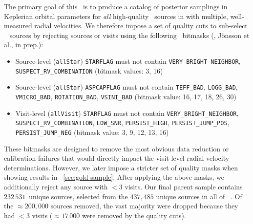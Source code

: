 \documentclass[modern]{aastex63}
\newcommand{\nsources}{\ensuremath{232\,531}}
\begin{document}
The primary goal of this \documentname\ is to produce a catalog of posterior
samplings in Keplerian orbital parameters for \emph{all} high-quality \apogee\
sources in  with multiple, well-measured radial velocities.
We therefore impose a set of quality cuts to sub-select \apogee\  sources
by rejecting sources or visits using the following \apogee\
bitmasks (\citealt{Holtzman:2018}, J\"onsson et al., in prep.):
\begin{itemize}
    \item Source-level (\texttt{allStar}) \texttt{STARFLAG} must not contain
    \texttt{VERY\_BRIGHT\_NEIGHBOR}, \texttt{SUSPECT\_RV\_COMBINATION} (bitmask
    values: 3, 16)
    \item Source-level (\texttt{allStar}) \texttt{ASPCAPFLAG} must not contain
    \texttt{TEFF\_BAD}, \texttt{LOGG\_BAD}, \texttt{VMICRO\_BAD},
    \texttt{ROTATION\_BAD}, \texttt{VSINI\_BAD} (bitmask value: 16, 17, 18, 26,
    30)
    \item Visit-level (\texttt{allVisit}) \texttt{STARFLAG} must not contain
    \texttt{VERY\_BRIGHT\_NEIGHBOR}, \texttt{SUSPECT\_RV\_COMBINATION},
    \texttt{LOW\_SNR}, \texttt{PERSIST\_HIGH}, \texttt{PERSIST\_JUMP\_POS},
    \texttt{PERSIST\_JUMP\_NEG} (bitmask value: 3, 9, 12, 13, 16)
\end{itemize}
These bitmasks are designed to remove the most obvious data reduction or
calibration failures that would directly impact the visit-level radial velocity
determinations.
However, we later impose a stricter set of quality masks when showing results in
\sectionname~\ref{sec:gold-sample}.
After applying the above masks, we additionally reject any source with $<3$
visits.
Our final parent sample contains \nsources\ unique sources, selected from the
$437,485$ unique sources in all of \apogee\ .
Of the $\approx$$200,000$ sources removed, the vast majority were dropped
because they had $<3$ visits ($\approx$$17\,000$ were removed by the quality
cuts).
\end{document}
